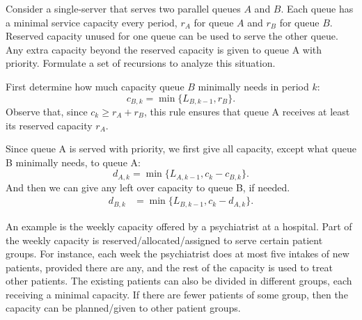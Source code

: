 \begin{extra}  Consider a single-server that serves two parallel queues $A$ and $B$.
 Each queue has a minimal service capacity every period, $r_A$ for queue $A$ and $r_B$ for queue $B$.
 Reserved capacity unused for one queue can be used to serve the other queue.
 Any extra capacity beyond the reserved capacity is given to queue A with priority.
 Formulate a set of recursions to analyze this situation.
\begin{solution}
 First determine how much capacity queue $B$ minimally needs in
 period $k$:
 \begin{equation*}
 c_{B,k} = \min\{L_{B,k-1}, r_B\}.
 \end{equation*}
 Observe that, since $c_k \geq r_A + r_B$, this rule ensures that
 queue A receives at least its reserved capacity $r_A$. 

 Since queue A is served with priority, we first give all capacity,
 except what queue B minimally needs, to queue A:
 \begin{equation*}
d_{A,k} = \min\{L_{A,k-1}, c_k-c_{B,k}\}.
\end{equation*}
And then we can give any left over capacity to queue B, if needed. 
\begin{align*}
d_{B, k} &= \min\{L_{B, k-1}, c_k-d_{A,k}\}.
\end{align*}

An example is the weekly capacity offered by a psychiatrist at a hospital.
Part of the weekly capacity is reserved/allocated/assigned to serve certain patient groups.
For instance, each week the psychiatrist does at most five intakes of new patients, provided there are any, and the rest of the capacity is used to treat other patients.
The existing patients can also be divided in different groups, each receiving a minimal capacity.
If there are fewer patients of some group, then the capacity can be planned/given to other patient groups.
\end{solution}
\end{extra}


